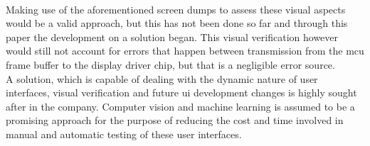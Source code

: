 \documentclass[Bachelor, BIC, english, fhCitStyle, IEEE]{BASE/twbook} %
\begin{document}
\\
Making use of the aforementioned screen dumps to assess these visual aspects would be a valid approach, but this has not been done so far and through this paper the development on a solution began. This visual verification however would still not account for errors that happen between transmission from the \ac{mcu} frame buffer to the display driver chip, but that is a negligible error source.
\\
A solution, which is capable of dealing with the dynamic nature of user interfaces, visual verification and future \ac{ui} development changes is highly sought after in the company. Computer vision and machine learning is assumed to be a promising approach for the purpose of reducing the cost and time involved in manual and automatic testing of these user interfaces.
\clearpage
\end{document}
